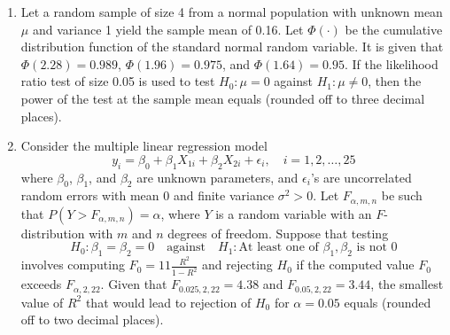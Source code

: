 \documentclass[journal,12pt,onecolumn]{IEEEtran}
\theoremstyle{remark}
\begin{document}
\begin{enumerate}
    \item Let a random sample of size 4 from a normal population with unknown mean $\mu$ and variance 1 yield the sample mean of 0.16. Let $\Phi(\cdot)$ be the cumulative distribution function of the standard normal random variable. It is given that $\Phi(2.28) = 0.989$, $\Phi(1.96) = 0.975$, and $\Phi(1.64) = 0.95$. If the likelihood ratio test of size 0.05 is used to test $H_0: \mu = 0$ against $H_1: \mu \neq 0$, then the power of the test at the sample mean equals  {\underline{\hspace{2cm}}}  (rounded off to three decimal places).

    \item Consider the multiple linear regression model
\[
    y_i = \beta_0 + \beta_1 X_{1i} + \beta_2 X_{2i} + \epsilon_i, \quad i = 1, 2, \dots, 25
\]
    where $\beta_0$, $\beta_1$, and $\beta_2$ are unknown parameters, and $\epsilon_i$'s are uncorrelated random errors with mean 0 and finite variance $\sigma^2 > 0$. Let $F_{\alpha, m, n}$ be such that $P(Y > F_{\alpha, m, n}) = \alpha$, where $Y$ is a random variable with an $F$-distribution with $m$ and $n$ degrees of freedom. Suppose that testing
\[
    H_0: \beta_1 = \beta_2 = 0 \quad \text{against} \quad H_1: \text{At least one of } \beta_1, \beta_2 \text{ is not 0}
\]
    involves computing $F_0 = 11\frac{R^2}{1 - R^2}$ and rejecting $H_0$ if the computed value $F_0$ exceeds $F_{\alpha, 2, 22}$. Given that $F_{0.025, 2, 22} = 4.38$ and $F_{0.05, 2, 22} = 3.44$, the smallest value of $R^2$ that would lead to rejection of $H_0$ for $\alpha = 0.05$ equals  {\underline{\hspace{2cm}}}  (rounded off to two decimal places).
\end{enumerate}
\end{document}
